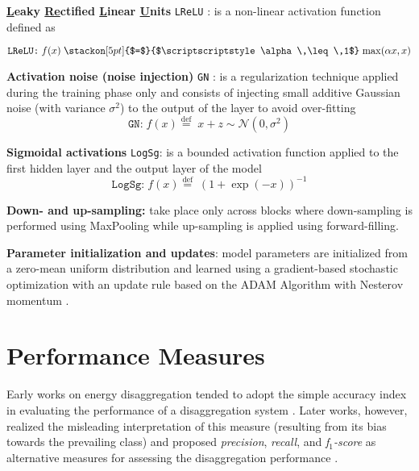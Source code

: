 \documentclass[twocolumn,letter,10pt]{IEEEtran} %
\begin{document}
\textbf{\underline{L}eaky \underline{Re}ctified \underline{L}inear \underline{U}nits} \texttt{LReLU} \cite{Maas_2013_RectifierNonLinearities}: is a non-linear activation function defined as

{\small\begin{equation*}
	\texttt{LReLU:}\; f(x) \mathrel{\stackon[5pt]{$=$}{$\scriptscriptstyle\alpha \,\leq\,1$}} \max(\alpha x, x)
	\end{equation*}}%


\textbf{Activation noise (noise injection)} \texttt{GN} \cite{Nair_2010_ReLU_RBM}: is a regularization technique applied during the training phase only and consists of injecting small additive Gaussian noise (with variance $\sigma^2$) to the output of the layer to avoid over-fitting
\begin{equation*}
\texttt{GN:}\; f(x) \stackrel{\text{def}}{=}\; x + z \sim \mathcal{N}(0, \sigma^2)
\end{equation*}

\textbf{Sigmoidal activations} \texttt{LogSg}: is a bounded activation function applied to the first hidden layer and the output layer of the model
\begin{equation}
\texttt{LogSg:}\; f(x) \stackrel{\text{def}}{=}\; (1+\exp(-x))^{-1}
\label{eq:logsg-activation}
\end{equation}

\textbf{Down- and up-sampling:} take place only across blocks where down-sampling is performed using MaxPooling while up-sampling is applied using forward-filling. 

\textbf{Parameter initialization and updates}: model parameters are initialized from a zero-mean uniform distribution \cite{Glorot_2010} and learned using a gradient-based stochastic  optimization \cite{Bottou_2012_StochasticGradientDescent} with an update rule based on the ADAM Algorithm \cite{Kingma_2014_ADAM} with Nesterov momentum \cite{Dozat_2015_NADAM}.

\section{Performance Measures}
\label{sec:performance-measures}

Early works on energy disaggregation tended to adopt the simple accuracy index in evaluating the performance of a disaggregation system \cite{Chang_2010, Belkin_2013, Makonin_2013_AMPds1}. Later works, however, realized the misleading interpretation of this measure (resulting from its bias towards the prevailing class) and proposed \emph{precision}, \emph{recall}, and \emph{f$_1$-score} as alternative measures for assessing the disaggregation performance \cite{Beckel_2014_ECO, Holmegaard_2016_IndustrialSettings, Kim_2010, Makonin_2015_NILMPerformanceEvaluation}. 
\end{document}
